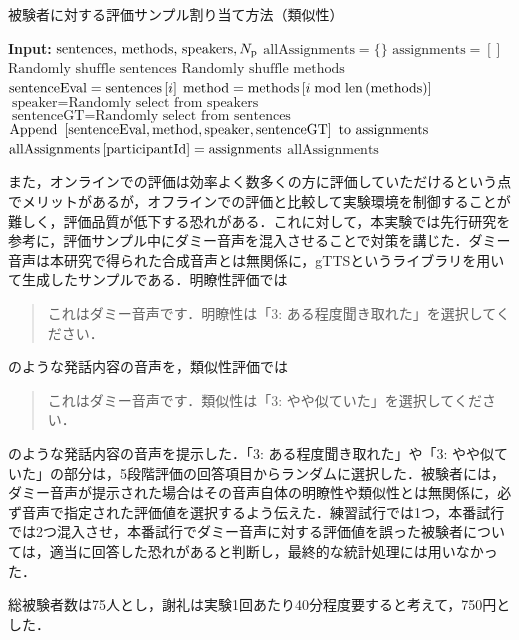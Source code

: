 \begin{algorithm}
    \caption{被験者に対する評価サンプル割り当て方法（類似性）}
    \label{sec4:algo:sample-assignment-sim}
    \begin{algorithmic}[1]
        \State \textbf{Input:} $\text{sentences, methods, speakers}, N_{\text{p}}$
        \State $\text{allAssignments} = \{\}$
        \State $\text{assignments} = []$
        \State $\text{Randomly shuffle sentences}$
        \State $\text{Randomly shuffle methods}$
        \State $\text{sentenceEval} = \text{sentences}\left[i\right]$
        \State $\text{method} = \text{methods}\left[i \bmod \text{len}\left(\text{methods}\right)\right]$
        \State $\text{speaker} = \text{Randomly select from speakers}$
        \State $\text{sentenceGT} = \text{Randomly select from sentences}$
        \State $\text{Append } \left[\text{sentenceEval}, \text{method}, \text{speaker}, \text{sentenceGT}\right] \text{ to assignments}$
        \EndFor
        \State $\text{allAssignments}\left[\text{participantId}\right] = \text{assignments}$
        \EndFor
        \State \Return $\text{allAssignments}$
    \end{algorithmic}
\end{algorithm}

また，オンラインでの評価は効率よく数多くの方に評価していただけるという点でメリットがあるが，オフラインでの評価と比較して実験環境を制御することが難しく，評価品質が低下する恐れがある．これに対して，本実験では先行研究\cite{kirkland2023stuck}を参考に，評価サンプル中にダミー音声を混入させることで対策を講じた．ダミー音声は本研究で得られた合成音声とは無関係に，gTTSというライブラリを用いて生成したサンプルである．明瞭性評価では
\begin{quote}
    これはダミー音声です．明瞭性は「3: ある程度聞き取れた」を選択してください．
\end{quote}
のような発話内容の音声を，類似性評価では
\begin{quote}
    これはダミー音声です．類似性は「3: やや似ていた」を選択してください．
\end{quote}
のような発話内容の音声を提示した．「3: ある程度聞き取れた」や「3: やや似ていた」の部分は，5段階評価の回答項目からランダムに選択した．被験者には，ダミー音声が提示された場合はその音声自体の明瞭性や類似性とは無関係に，必ず音声で指定された評価値を選択するよう伝えた．練習試行では1つ，本番試行では2つ混入させ，本番試行でダミー音声に対する評価値を誤った被験者については，適当に回答した恐れがあると判断し，最終的な統計処理には用いなかった．

総被験者数は75人とし，謝礼は実験1回あたり40分程度要すると考えて，750円とした．